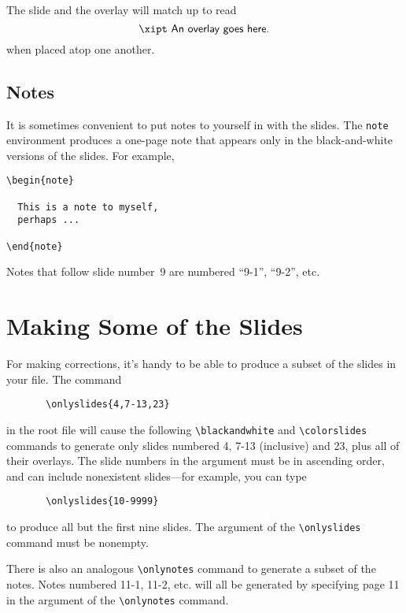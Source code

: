 The slide and the overlay will match up to read
\[ \mbox{\xipt \sf An overlay goes here.} \]
when placed atop one another.

\subsection{Notes}

It is sometimes convenient to put notes to yourself in with the
slides.  The \mbox{\tt note} environment
produces a one-page note that appears only in the black-and-white
versions of the slides.  For example,
\begin{exambox}
\midbox
\begin{verbatim}
\begin{note}

  This is a note to myself,
  perhaps ...

\end{note}
\end{verbatim}
\end{exambox}

\noindent 
Notes that follow slide number~9 are numbered
``9-1'', ``9-2'', etc.  


\section{Making Some of the Slides}

For making corrections, it's handy to be able to produce a subset of
the slides in your file.  The command
\begin{verbatim}
       \onlyslides{4,7-13,23}
\end{verbatim}
in the root file will cause the following
\xsp{}\hbox{\verb"\blackandwhite"}\xsp{} and
\xsp{}\hbox{\verb"\colorslides"}\xsp{} commands to generate only
slides numbered 4, 7-13 (inclusive) and 23, plus all of their
overlays.  The slide numbers in the argument must be in ascending
order, and can include nonexistent slides---for example, you can type
\begin{verbatim}
       \onlyslides{10-9999}
\end{verbatim}
to produce all but the first nine slides.  The argument of the
\xsp{}\hbox{\verb"\onlyslides"}\xsp{} command must be nonempty.

There is also an analogous
\xsp{}\hbox{\verb"\onlynotes"}\xsp{} command to
generate a subset of the notes.  Notes numbered 11-1, 11-2, etc. will
all be generated by specifying page 11 in the argument of the
\xsp{}\hbox{\verb"\onlynotes"}\xsp{} command.

